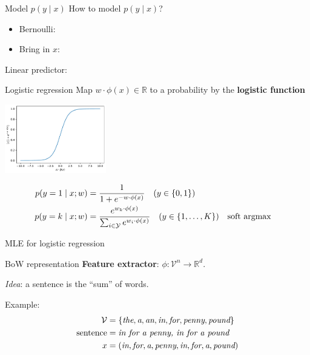 \documentclass[usenames,dvipsnames,notes]{beamer}
\newcommand\w[1]{\textit{#1}}
\begin{document}
\begin{frame}
    {Model $p(y\mid x)$}
    How to model $p(y\mid x)$?
    \begin{itemize}
        \item[] Bernoulli:
        \item[] Bring in $x$:
    \end{itemize}

    Linear predictor:\\
    \vspace{7em}
\end{frame}

\begin{frame}
    {Logistic regression}
    Map $w\cdot\phi(x) \in\mathbb{R}$ to a probability by the \textbf{logistic function}
    \begin{center}
        \includegraphics[height=3cm]{figures/logistic}
    \end{center}
    \begin{align*}
    p(y=1\mid x; w) &= \frac{1}{1 + e^{-w\cdot\phi(x)}} \quad (y\in \left\{ 0,1 \right\})\\
        p(y=k\mid x; w) &= \frac{e^{w_k\cdot\phi(x)}}{\sum_{i\in\mathcal{Y}}e^{w_i\cdot\phi(x)}} \quad (y\in \left\{ 1, \ldots, K \right\}) && \text{soft argmax}
    \end{align*}
\end{frame}

\begin{frame}
    {MLE for logistic regression}
\end{frame}

\begin{frame}
    {BoW representation}
    \textbf{Feature extractor}: $\phi\colon \mathcal{V}^n \rightarrow \mathbb{R}^d$.

    \emph{Idea}: a sentence is the ``sum'' of words.

    Example:
    \begin{align*}
        \mathcal{V} &= \pc{\w{the}, \w{a}, \w{an}, \w{in}, \w{for}, \w{penny}, \w{pound}}\\
        \text{sentence} &= \w{in for a penny, in for a pound} \\
        x &= \p{\w{in}, \w{for}, \w{a}, \w{penny}, \w{in}, \w{for}, \w{a}, \w{pound}}
    \end{align*}
    \vspace{7em}
\end{frame}
\end{document}
